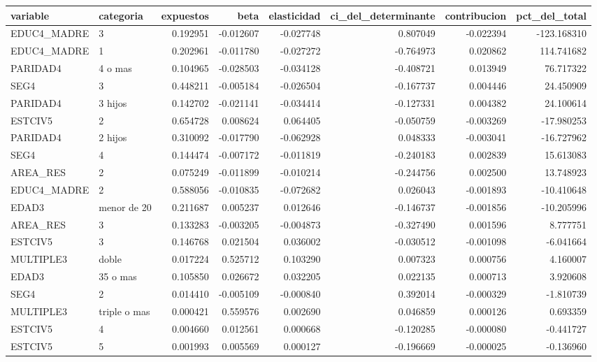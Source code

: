 \begin{tabular}{llrrrrrr}
\toprule
variable & categoria & expuestos & beta & elasticidad & ci\_del\_determinante & contribucion & pct\_del\_total \\
\midrule
EDUC4\_MADRE & 3 & 0.192951 & -0.012607 & -0.027748 & 0.807049 & -0.022394 & -123.168310 \\
EDUC4\_MADRE & 1 & 0.202961 & -0.011780 & -0.027272 & -0.764973 & 0.020862 & 114.741682 \\
PARIDAD4 & 4 o mas & 0.104965 & -0.028503 & -0.034128 & -0.408721 & 0.013949 & 76.717322 \\
SEG4 & 3 & 0.448211 & -0.005184 & -0.026504 & -0.167737 & 0.004446 & 24.450909 \\
PARIDAD4 & 3 hijos & 0.142702 & -0.021141 & -0.034414 & -0.127331 & 0.004382 & 24.100614 \\
ESTCIV5 & 2 & 0.654728 & 0.008624 & 0.064405 & -0.050759 & -0.003269 & -17.980253 \\
PARIDAD4 & 2 hijos & 0.310092 & -0.017790 & -0.062928 & 0.048333 & -0.003041 & -16.727962 \\
SEG4 & 4 & 0.144474 & -0.007172 & -0.011819 & -0.240183 & 0.002839 & 15.613083 \\
AREA\_RES & 2 & 0.075249 & -0.011899 & -0.010214 & -0.244756 & 0.002500 & 13.748923 \\
EDUC4\_MADRE & 2 & 0.588056 & -0.010835 & -0.072682 & 0.026043 & -0.001893 & -10.410648 \\
EDAD3 & menor de 20 & 0.211687 & 0.005237 & 0.012646 & -0.146737 & -0.001856 & -10.205996 \\
AREA\_RES & 3 & 0.133283 & -0.003205 & -0.004873 & -0.327490 & 0.001596 & 8.777751 \\
ESTCIV5 & 3 & 0.146768 & 0.021504 & 0.036002 & -0.030512 & -0.001098 & -6.041664 \\
MULTIPLE3 & doble & 0.017224 & 0.525712 & 0.103290 & 0.007323 & 0.000756 & 4.160007 \\
EDAD3 & 35 o mas & 0.105850 & 0.026672 & 0.032205 & 0.022135 & 0.000713 & 3.920608 \\
SEG4 & 2 & 0.014410 & -0.005109 & -0.000840 & 0.392014 & -0.000329 & -1.810739 \\
MULTIPLE3 & triple o mas & 0.000421 & 0.559576 & 0.002690 & 0.046859 & 0.000126 & 0.693359 \\
ESTCIV5 & 4 & 0.004660 & 0.012561 & 0.000668 & -0.120285 & -0.000080 & -0.441727 \\
ESTCIV5 & 5 & 0.001993 & 0.005569 & 0.000127 & -0.196669 & -0.000025 & -0.136960 \\
\bottomrule
\end{tabular}
